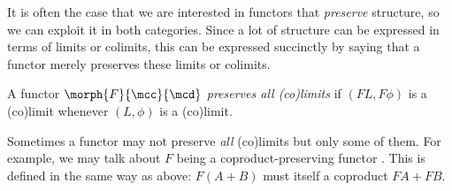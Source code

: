 It is often the case that we are interested in functors that \emph{preserve}
structure, so we can exploit it in both categories.
Since a lot of structure can be expressed in terms of limits or colimits, this
can be expressed succinctly by saying that a functor merely preserves these
limits or colimits.

\begin{definition}
    A functor \(\morph{F}{\mcc}{\mcd}\) \emph{preserves all (co)limits} if
    \((FL,F\phi)\) is a (co)limit whenever \((L,\phi)\) is a (co)limit.
\end{definition}

Sometimes a functor may not preserve \emph{all} (co)limits but only some of
them.
For example, we may talk about \(F\) being a coproduct-preserving functor .
This is defined in the same way as above: \(F(A+B)\) must itself a coproduct
\(FA + FB\).